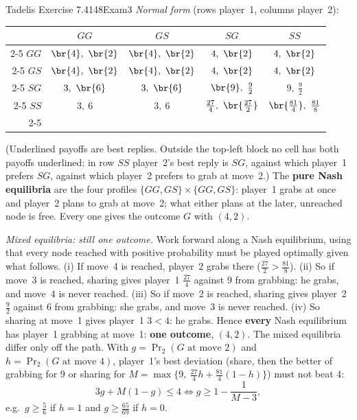 \begin{exsol}{Tadelis Exercise 7.4}{148}{Exam}{3}
\emph{Normal form} (rows player~1, columns player~2):
\begin{center}
\begin{tabular}{r|c|c|c|c|}
\multicolumn{1}{r}{} & \multicolumn{1}{c}{$GG$} & \multicolumn{1}{c}{$GS$} &
\multicolumn{1}{c}{$SG$} & \multicolumn{1}{c}{$SS$}\\ \cline{2-5}
$GG$ & $\br{4},\ \br{2}$ & $\br{4},\ \br{2}$ & $4,\ \br{2}$ & $4,\ \br{2}$ \\ \cline{2-5}
$GS$ & $\br{4},\ \br{2}$ & $\br{4},\ \br{2}$ & $4,\ \br{2}$ & $4,\ \br{2}$ \\ \cline{2-5}
$SG$ & $3,\ \br{6}$ & $3,\ \br{6}$ & $\br{9},\ \frac92$ & $9,\ \frac92$ \\ \cline{2-5}
$SS$ & $3,\ 6$ & $3,\ 6$ & $\frac{27}{4},\ \br{\frac{27}{2}}$ & $\br{\frac{81}{4}},\ \frac{81}{8}$ \\ \cline{2-5}
\end{tabular}
\end{center}
(Underlined payoffs are best replies. Outside the top-left block no cell has both payoffs
underlined: in row $SS$ player~2's best reply is $SG$, against which player~1 prefers $SG$, against
which player~2 prefers to grab at move~2.) The \textbf{pure Nash equilibria} are the
four profiles $\{GG, GS\} \times \{GG, GS\}$: player~1 grabs at once and player~2 plans to grab
at move~2; what either plans at the later, unreached node is free. Every one gives the outcome
$G$ with $(4,2)$.

\emph{Mixed equilibria: still one outcome.} Work forward along a Nash equilibrium, using that
every node reached with positive probability must be played optimally given what follows.
(i) If move~4 is reached, player~2 grabs there ($\frac{27}{2} > \frac{81}{8}$). (ii) So if move~3 is
reached, sharing gives player~1 $\frac{27}{4}$ against $9$ from grabbing: he grabs, and move~4 is
never reached. (iii) So if move~2 is reached, sharing gives player~2 $\frac92$ against $6$ from
grabbing: she grabs, and move~3 is never reached. (iv) So sharing at move~1 gives player~1
$3 < 4$: he grabs. Hence \textbf{every} Nash equilibrium has player~1 grabbing at move~1:
\textbf{one outcome}, $(4,2)$. The mixed equilibria differ only off
the path. With $g = \Pr_2(G \text{ at move 2})$ and $h = \Pr_2(G \text{ at move 4})$, player~1's best
deviation (share, then the better of grabbing for 9 or sharing for
$M = \max\{9,\ \frac{27}{4}h + \frac{81}{4}(1-h)\}$) must not beat 4:
\[
  3g + M(1-g) \le 4 \iff g \ge 1 - \frac{1}{M - 3},
\]
e.g.\ $g \ge \frac56$ if $h = 1$ and $g \ge \frac{65}{69}$ if $h = 0$.


\end{exsol}
